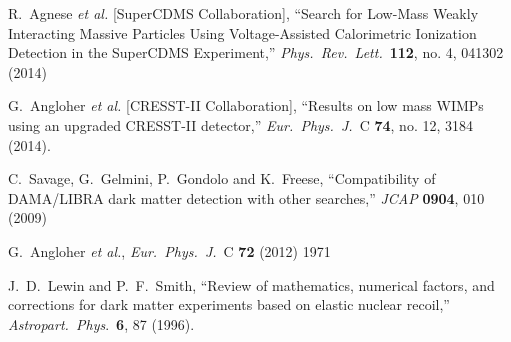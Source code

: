 \documentclass[12pt]{article}
\begin{document}
\begin{thebibliography}{99}
 
  R.~Agnese {\it et al.}  [SuperCDMS Collaboration],
  ``Search for Low-Mass Weakly Interacting Massive Particles Using Voltage-Assisted Calorimetric Ionization Detection in the SuperCDMS Experiment,''
  \textit{Phys.\ Rev.\ Lett.}\  {\bf 112}, no. 4, 041302 (2014)

  G.~Angloher {\it et al.}  [CRESST-II Collaboration],
  ``Results on low mass WIMPs using an upgraded CRESST-II detector,''
  \textit{Eur.\ Phys.\ J.}\ C {\bf 74}, no. 12, 3184 (2014).


  C.~Savage, G.~Gelmini, P.~Gondolo and K.~Freese,
  ``Compatibility of DAMA/LIBRA dark matter detection with other searches,''
 \textit{ JCAP} {\bf 0904}, 010 (2009)


  G.~Angloher {\it et al.},
 \textit{ Eur.\ Phys.\ J.}\ C {\bf 72} (2012) 1971



 
 
 



  J.~D.~Lewin and P.~F.~Smith,
  ``Review of mathematics, numerical factors, and corrections for dark matter experiments based on elastic nuclear recoil,''
  \textit{Astropart.\ Phys}.\  {\bf 6}, 87 (1996).



\end{thebibliography}
\end{document}
